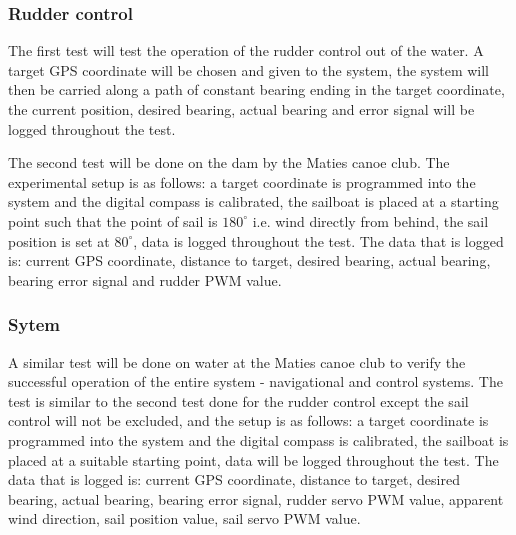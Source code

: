 \subsubsection{Rudder control}
The first test will test the operation of the rudder control out of the water. A target GPS coordinate will be chosen and given to the system, the system 
will then be carried along a path of constant bearing ending in the target coordinate, the current position, desired bearing, actual bearing and error signal
will be logged throughout the test. 

The second test will be done on the dam by the Maties canoe club. The experimental setup is as follows: a target coordinate is programmed into the system and 
the digital compass is calibrated, the sailboat is placed at a starting point such that the point of sail is $180^{\circ}$ i.e. wind directly from behind, the
sail position is set at $80^{\circ}$, data is logged throughout the test. The data that is logged is: current GPS coordinate, distance to target, desired bearing, 
actual bearing, bearing error signal and rudder PWM value.

\subsubsection{Sytem}
A similar test will be done on water at the Maties canoe club to verify the successful operation of the entire system - navigational and control systems. The test
is similar to the second test done for the rudder control except the sail control will not be excluded, and the setup is as follows: a target coordinate is 
programmed into the system and the digital compass is calibrated, the sailboat is placed at a suitable starting point, data will be logged throughout the test. 
The data that is logged is: current GPS coordinate, distance to target, desired bearing, actual bearing, bearing error signal, rudder servo PWM value, apparent 
wind direction, sail position value, sail servo PWM value.





